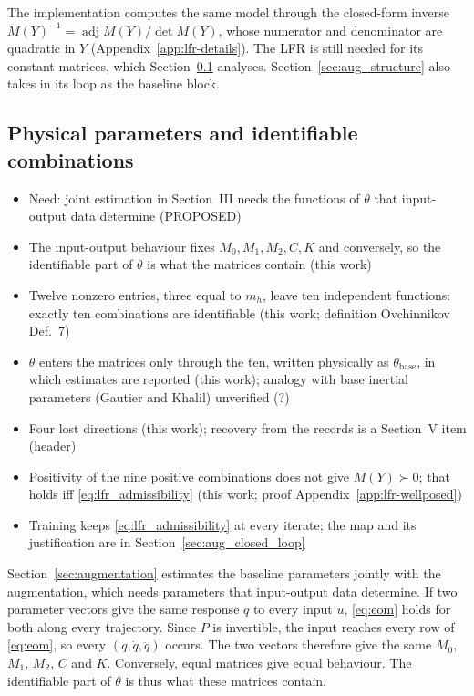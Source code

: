 The implementation computes the same model through the closed-form inverse
$M(Y)^{-1}=\operatorname{adj}M(Y)/\det M(Y)$, whose numerator and denominator
are quadratic in $Y$ (Appendix~\ref{app:lfr-details}).
The LFR is still needed for its constant matrices, which
Section~\ref{sec:params} analyses.
Section~\ref{sec:aug_structure} also takes in its loop as the baseline block.

\subsection{Physical parameters and identifiable combinations}\label{sec:params}
\ifdraft
\begin{itemize}
\item Need: joint estimation in Section~III needs the functions of $\theta$ that input-output data determine (PROPOSED)
\item The input-output behaviour fixes $M_0,M_1,M_2,C,K$ and conversely, so the identifiable part of $\theta$ is what the matrices contain (this work)
\item Twelve nonzero entries, three equal to $m_h$, leave ten independent functions: exactly ten combinations are identifiable (this work; definition Ovchinnikov Def.~7)
\item $\theta$ enters the matrices only through the ten, written physically as $\theta_{\mathrm{base}}$, in which estimates are reported (this work); analogy with base inertial parameters (Gautier and Khalil) unverified (?)
\item Four lost directions (this work); recovery from the records is a Section~V item (header)
\item Positivity of the nine positive combinations does not give $M(Y)\succ0$; that holds iff \eqref{eq:lfr_admissibility} (this work; proof Appendix~\ref{app:lfr-wellposed})
\item Training keeps \eqref{eq:lfr_admissibility} at every iterate; the map and its justification are in Section~\ref{sec:aug_closed_loop}
\end{itemize}
\fi

Section~\ref{sec:augmentation} estimates the baseline parameters jointly with
the augmentation, which needs parameters that input-output data determine.
If two parameter vectors give the same response $q$ to every input $u$,
\eqref{eq:eom} holds for both along every trajectory.
Since $P$ is invertible, the input reaches every row of \eqref{eq:eom}, so
every $(q,\dot q,\ddot q)$ occurs.
The two vectors therefore give the same $M_0$, $M_1$, $M_2$, $C$ and $K$.
Conversely, equal matrices give equal behaviour.
The identifiable part of $\theta$ is thus what these matrices contain.

